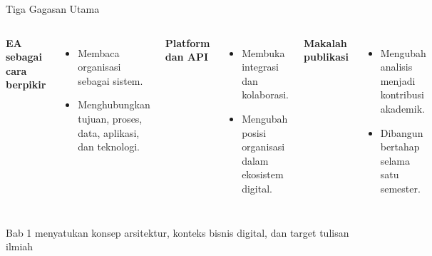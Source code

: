 \documentclass[aspectratio=169, table]{beamer}
\newcommand{\takeaway}[1]{%
  \vspace{4pt}
  {\footnotesize #1}
}
\begin{document}
\begin{frame}{Tiga Gagasan Utama}
  \vspace{10pt}
  \begin{columns}[t]
    \textbf{EA sebagai cara berpikir}
    \vspace{4pt}
    \begin{itemize}
      \item Membaca organisasi sebagai sistem.
      \item Menghubungkan tujuan, proses, data, aplikasi, dan teknologi.
    \end{itemize}

    \textbf{Platform dan API}
    \vspace{4pt}
    \begin{itemize}
      \item Membuka integrasi dan kolaborasi.
      \item Mengubah posisi organisasi dalam ekosistem digital.
    \end{itemize}

    \textbf{Makalah publikasi}
    \vspace{4pt}
    \begin{itemize}
      \item Mengubah analisis menjadi kontribusi akademik.
      \item Dibangun bertahap selama satu semester.
    \end{itemize}
  \end{columns}

  \takeaway{Bab 1 menyatukan konsep arsitektur, konteks bisnis digital, dan target tulisan ilmiah}
\end{frame}
\end{document}
